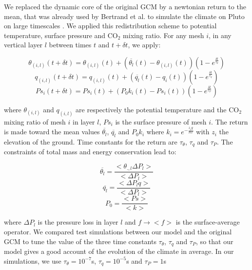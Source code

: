 We replaced the dynamic core of the original GCM by a newtonian return to the mean,
that was already  used by Bertrand et al. to simulate the climate on Pluto on large timescales
\citep{Forg:17}. We applied this redistribution scheme to potential temperature, surface
pressure and CO$_2$ mixing ratio. For any mesh $i$, in any vertical layer $l$ between times
$t$ and $t + \delta t$, we apply:

\begin{equation}
\label{rappel}
	\theta_{(i,l)}(t+\delta t) = \theta_{(i,l)}(t) + \left( \overline{\theta_{l}}(t) -  \theta_{(i,l)}(t) \right) \left( 1 - e^{\frac{\delta t}{\tau_\theta}} \right)
\end{equation}
\begin{equation}
	q_{(i,l)}(t+\delta t) = q_{(i,l)}(t) + \left( \overline{q_{l}}(t) -  q_i(t) \right) \left( 1 - e^{\frac{\delta t}{\tau_q}} \right)
\end{equation}
\begin{equation}
	Ps_i(t+\delta t) = Ps_i(t) + \left( P_0 k_i(t) -  Ps_i(t) \right) \left( 1 - e^{\frac{\delta t}{\tau_P}} \right)
\end{equation}

where $\theta_{(i,l)}$ and $q_{(i,l)}$ are respectively the potential temperature and the CO$_2$ 
mixing ratio of mesh $i$ in layer $l$, $Ps_i$ is the surface pressure of mesh $i$. The return is
made toward the mean values $\overline{\theta_{l}}$, $\overline{q_{l}}$ and $P_0 k_i$ where 
$k_i = e^{-\frac{z_i g}{RT}}$ with $z_i$ the elevation of the ground. Time constants for the 
return are $\tau_\theta$, $\tau_q$ and $\tau_P$. The constraints of total mass and energy
conservation lead to:

\begin{equation}
	\overline{\theta_{l}} = \frac{ <\theta_{.,l} \Delta P_{l}>}{< \Delta P_{l} >}
\end{equation}
\begin{equation}
	\overline{q_{l}} =  \frac{< \Delta P_{l} q >}{< \Delta P_{l} >}
\end{equation}
\begin{equation}
	P_0 = \frac{< Ps >}{< k >}
\end{equation}

where $\Delta P_{l}$ is the pressure loss in layer $l$ and $f \rightarrow < f >$ is the 
surface-average operator. We compared test simulations between our model and the original GCM 
to tune the value of the three time constants $\tau_\theta$, $\tau_q$ and $\tau_P$,
so that our model gives a good account of the evolution of the climate in average. In our
simulations, we use $\tau_\theta = 10^{-7}$s, $\tau_q = 10^{-5}$s and $\tau_P = 1$s



